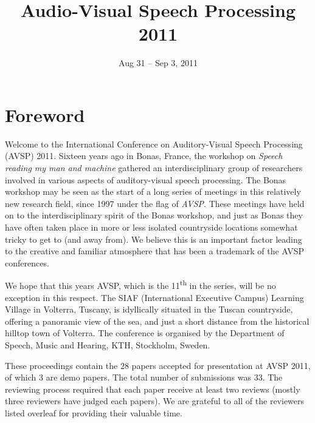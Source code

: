 \usepackage[utf8]{inputenc}
\usepackage{multicol}

\title{Audio-Visual Speech Processing 2011}
\date{Aug 31 -- Sep 3, 2011}
\address{Volterra, Italy}


\makeindex


\maketitle
\newpage
\section*{Foreword}
Welcome to the International Conference on Auditory-Visual Speech Processing (AVSP) 2011. Sixteen years ago in Bonas, France, the workshop on \emph{Speech reading my man and machine} gathered an interdisciplinary group of researchers involved in various aspects of auditory-visual speech processing. The Bonas workshop may be seen as the start of a long series of meetings in this relatively new research field, since 1997 under the flag of \emph{AVSP}. These meetings have held on to the interdisciplinary spirit of the Bonas workshop, and just as Bonas they have often taken place in more or less isolated countryside locations somewhat tricky to get to (and away from). We believe this is an important factor leading to the creative and familiar atmosphere that has been a trademark of the AVSP conferences.

We hope that this years AVSP, which is the 11\textsuperscript{th} in the series, will be no exception in this respect.  The SIAF (International Executive Campus) Learning Village in Volterra, Tuscany, is idyllically situated in the Tuscan countryside, offering a panoramic view of the sea, and just a short distance from the historical hilltop town of Volterra. The conference is organised by the Department of Speech, Music and Hearing, KTH, Stockholm, Sweden.

These proceedings contain the 28 papers accepted for presentation at AVSP 2011, of which 3 are demo papers. The total number of submissions was 33. The reviewing process required that each paper receive at least two reviews (mostly three reviewers have judged each papers). We are grateful to all of the reviewers listed overleaf for providing their valuable time. 

